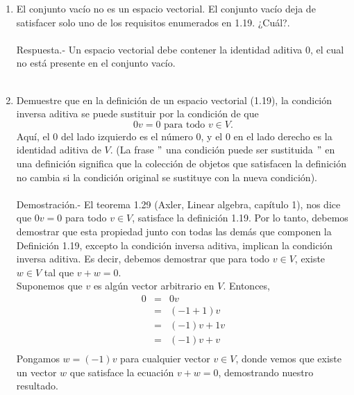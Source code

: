 \begin{enumerate}[\bfseries 1.]
    \item El conjunto vacío no es un espacio vectorial. El conjunto vacío deja de satisfacer solo uno de los requisitos enumerados en 1.19. ¿Cuál?.\\\\
	Respuesta.-\; Un espacio vectorial debe contener la identidad aditiva $0$, el cual no está presente en el conjunto vacío.\\\\

    \item Demuestre que en la definición de un espacio vectorial (1.19), la condición inversa aditiva se puede sustituir por la condición de que
    $$0v=0\mbox{ para todo } v\in V.$$
    Aquí, el $0$ del lado izquierdo es el número $0$, y el $0$ en el lado derecho es la identidad aditiva de $V$. (La frase $"$ una condición puede ser sustituida $"$ en una definición significa que la colección de objetos que satisfacen la definición no cambia si la condición original se sustituye con la nueva condición).\\\\
	Demostración.-\;  El teorema 1.29 (Axler, Linear algebra, capítulo 1), nos dice que $0v=0$ para todo $v\in V$, satisface la definición 1.19. Por lo tanto, debemos demostrar que esta propiedad junto con todas las demás que componen la Definición 1.19, excepto la condición inversa aditiva, implican la condición inversa aditiva. Es decir, debemos demostrar que para todo $v\in V$, existe $w\in V$ tal que $v+w=0.$\\ 
	Suponemos que $v$ es algún vector arbitrario en $V$. Entonces,
	$$\begin{array}{rcl}
	    0 &=& 0v \\
	      &=& (-1+1)v\\
	      &=& (-1)v + 1v\\
	      &=& (-1)v + v\\
	\end{array}$$
	Pongamos $w=(-1)v$ para cualquier vector $v\in V$, donde vemos que existe un vector $w$ que satisface la ecuación $v+w=0$, demostrando nuestro resultado.\\\\



\end{enumerate}
